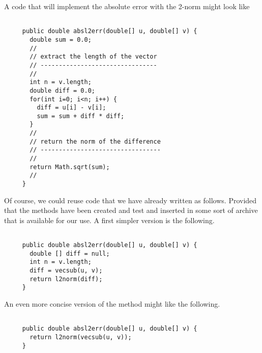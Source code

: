 \documentclass[10pt,fleqn]{article}
\begin{document}
A code that will implement the absolute error with the 2-norm might look like
\begin{verbatim}

     public double absl2err(double[] u, double[] v) {
       double sum = 0.0;
       //
       // extract the length of the vector
       // --------------------------------
       //
       int n = v.length;
       double diff = 0.0;
       for(int i=0; i<n; i++) {
         diff = u[i] - v[i];
         sum = sum + diff * diff;
       }
       //
       // return the norm of the difference
       // ---------------------------------
       //
       return Math.sqrt(sum);
       //
     }

\end{verbatim}
Of course, we could reuse code that we have already written as follows. Provided
that the methods have been created and test and inserted in some sort of archive
that is available for our use. A first simpler version is the following.
\begin{verbatim}

     public double absl2err(double[] u, double[] v) {
       double [] diff = null;
       int n = v.length;
       diff = vecsub(u, v);
       return l2norm(diff);
     }

\end{verbatim}
An even more concise version of the method might like the following.
\begin{verbatim}

     public double absl2err(double[] u, double[] v) {
       return l2norm(vecsub(u, v));
     }

\end{verbatim}
\end{document}
